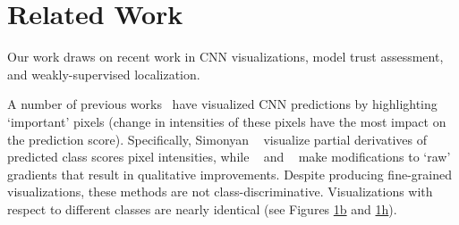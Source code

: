 \vspace{-15pt}
\section{Related Work}

Our work draws on recent work in CNN visualizations, model trust assessment, and weakly-supervised localization.


\noindent {}
A number of previous works~\cite{simonyan_arxiv13,springenberg_arxiv14,zeiler_eccv14,Gan_2015_CVPR} have visualized CNN predictions by highlighting `important' pixels (\ie change in intensities of these pixels have the most impact on the prediction score).
Specifically, Simonyan \etal~\cite{simonyan_arxiv13} visualize partial derivatives of predicted class scores \wrt pixel intensities, while \gb{}~\cite{springenberg_arxiv14} and \dec{}~\cite{zeiler_eccv14} make modifications to `raw' gradients that result in qualitative improvements.
Despite producing fine-grained visualizations, these methods are not class-discriminative. Visualizations with respect to different classes are nearly identical (see Figures \hyperlink{page.2}{1b} and \hyperlink{page.2}{1h}).

